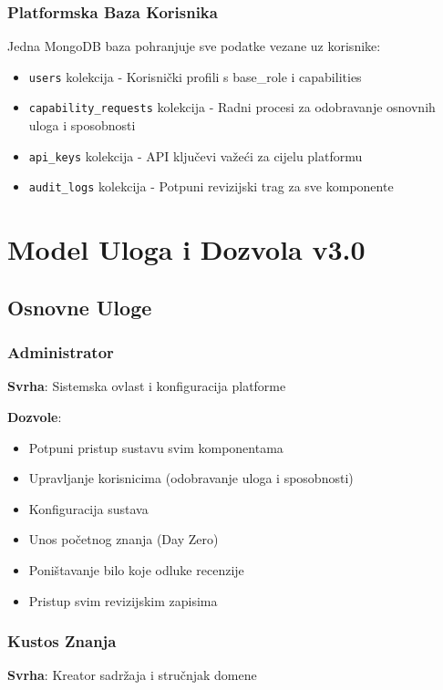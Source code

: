 \documentclass[12pt,a4paper]{article}
\begin{document}
\subsubsection{Platformska Baza Korisnika}
Jedna MongoDB baza pohranjuje sve podatke vezane uz korisnike:
\begin{itemize}
    \item \texttt{users} kolekcija - Korisnički profili s base\_role i capabilities
    \item \texttt{capability\_requests} kolekcija - Radni procesi za odobravanje osnovnih uloga i sposobnosti
    \item \texttt{api\_keys} kolekcija - API ključevi važeći za cijelu platformu
    \item \texttt{audit\_logs} kolekcija - Potpuni revizijski trag za sve komponente
\end{itemize}

\section{Model Uloga i Dozvola v3.0}

\subsection{Osnovne Uloge}

\subsubsection{Administrator}
\textbf{Svrha}: Sistemska ovlast i konfiguracija platforme

\textbf{Dozvole}:
\begin{itemize}
    \item Potpuni pristup sustavu svim komponentama
    \item Upravljanje korisnicima (odobravanje uloga i sposobnosti)
    \item Konfiguracija sustava
    \item Unos početnog znanja (Day Zero)
    \item Poništavanje bilo koje odluke recenzije
    \item Pristup svim revizijskim zapisima
\end{itemize}

\subsubsection{Kustos Znanja}
\textbf{Svrha}: Kreator sadržaja i stručnjak domene
\end{document}
